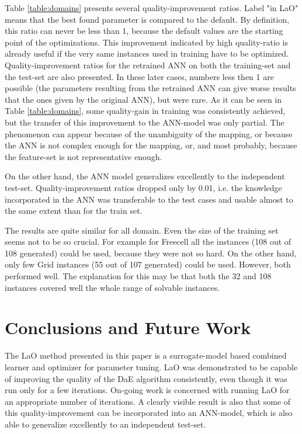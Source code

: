 \documentclass{MYsig-alternate}
\begin{document}
Table \ref{table:domains} presents several quality-improvement ratios. Label "in LaO" means that the best found parameter is compared to the default. By definition, this ratio can never be less than 1, because the default values are the starting point of the optimizations. This improvement indicated by high quality-ratio is already useful if the very same instances used in training have to be optimized. Quality-improvement ratios for the retrained ANN on both the training-set and the test-set are also presented. In these later cases, numbers less then 1 are possible (the parameters resulting from the retrained ANN can give worse results that the ones given by the original ANN), but were rare. As it can be seen in Table \ref{table:domains}, some quality-gain in training was consistently achieved, but the transfer of this improvement to the ANN-model was only partial. The phenomenon can appear because of the unambiguity of the mapping, or because the ANN is not complex enough for the mapping, or, and most probably, because the feature-set is not representative enough. 

On the other hand, the ANN model generalizes excellently to the independent test-set. Quality-improvement ratios dropped only by 0.01, i.e. the knowledge incorporated in the ANN was transferable to the test cases and usable almost to the same extent than for the train set.

The results are quite similar for all domain. Even the size of the training set seems not to be so crucial. For example for Freecell all the instances (108 out of 108 generated) could be used, because they were not so hard. On the other hand, only few  Grid instances (55 out of 107 generated) could be used. However, both performed well. The explanation for this may be that both the 32 and 108 instances covered well the whole range of solvable instances.

\section{Conclusions and Future Work}
\label{section:conclusions}
\label{section:futurework}	

The LaO method presented in this paper is a surrogate-model based combined learner and optimizer for parameter tuning. LaO was demonstrated to be capable of improving the quality of the DaE algorithm consistently, even though it was run only for a few iterations. On-going work is concerned with running LaO for an appropriate number of iterations. A clearly visible result is also that some of this quality-improvement can be incorporated into an ANN-model, which is also able to generalize excellently to an independent test-set.
\end{document}
